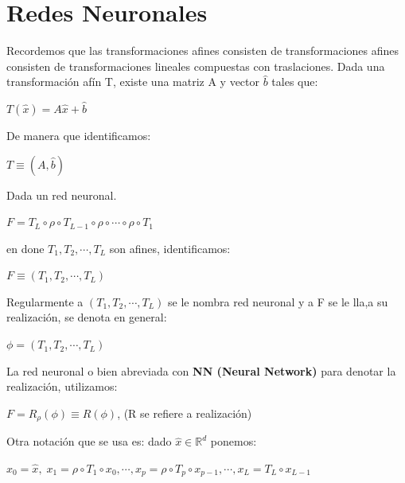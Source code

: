 \documentclass[12pt,a4paper]{book}
\begin{document}
\section{Redes Neuronales}
Recordemos que las transformaciones afines consisten de transformaciones afines consisten de transformaciones lineales compuestas con traslaciones. Dada una transformación afín T, existe una matriz A y vector $\widehat{b}$ tales que:
\begin{center}
$T(\widehat{x})=A\widehat{x}+\widehat{b}$
\end{center}
De manera que identificamos:
\begin{center}
$T\equiv(A,\widehat{b})$
\end{center}
Dada un red neuronal.
\begin{center}
$F=T_{L}\circ\rho\circ T_{L-1}\circ\rho\circ \cdots \circ\rho\circ T_{1}$
\end{center}
en done $T_{1},T_{2},\cdots,T_{L}$ son afines, identificamos:
\begin{center}
$F\equiv(T_{1},T_{2},\cdots,T_{L})$
\end{center}
Regularmente a $(T_{1},T_{2},\cdots,T_{L})$ se le nombra red neuronal y a F se le lla,a su realización, se denota en general:
\begin{center}
$\phi=(T_{1},T_{2},\cdots,T_{L})$
\end{center}
La red neuronal o bien abreviada con \textbf{NN (Neural Network)} para denotar la realización, utilizamos:
\begin{center}
$F=R_{\rho}(\phi)\equiv R(\phi)$, (R se refiere a realización)
\end{center}
Otra notación que se usa es: dado $\widehat{x}\in\mathbb{R}^{d}$ ponemos:
\begin{center}
$x_{0}=\widehat{x},\;x_{1}=\rho\circ T_{1}\circ x_{0},\cdots,x_{p}=\rho\circ T_{p}\circ x_{p-1},\cdots,x_{L}=T_{L}\circ x_{L-1}$
\end{center}
\end{document}
